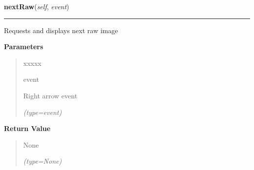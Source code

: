 \hspace{.8\funcindent}\begin{boxedminipage}{\funcwidth}

    \raggedright \textbf{nextRaw}(\textit{self}, \textit{event})

    \vspace{-1.5ex}

    \rule{\textwidth}{0.5\fboxrule}
\setlength{\parskip}{2ex}
    Requests and displays next raw image

\setlength{\parskip}{1ex}
      \textbf{Parameters}
      \vspace{-1ex}

      \begin{quote}
        \begin{Ventry}{xxxxx}

          \item[event]

          Right arrow event

            {\it (type=event)}

        \end{Ventry}

      \end{quote}

      \textbf{Return Value}
    \vspace{-1ex}

      \begin{quote}
      None

      {\it (type=None)}

      \end{quote}

    \end{boxedminipage}

    \label{client_gui:GuiClass:previousRaw}

    \vspace{0.5ex}

